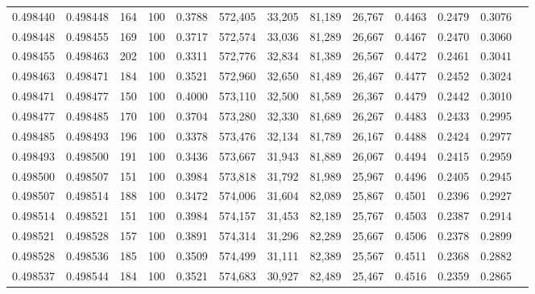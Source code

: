 \begin{tabular}{rrrrrrrrrrrrr}
0.498440 & 0.498448 &   164 & 100 &                                     0.3788 & 572,405 &  33,205 &  81,189 &  26,767 & 0.4463 & 0.2479 & 0.3076 \\
0.498448 & 0.498455 &   169 & 100 &                                     0.3717 & 572,574 &  33,036 &  81,289 &  26,667 & 0.4467 & 0.2470 & 0.3060 \\
0.498455 & 0.498463 &   202 & 100 &                                     0.3311 & 572,776 &  32,834 &  81,389 &  26,567 & 0.4472 & 0.2461 & 0.3041 \\
0.498463 & 0.498471 &   184 & 100 &                                     0.3521 & 572,960 &  32,650 &  81,489 &  26,467 & 0.4477 & 0.2452 & 0.3024 \\
0.498471 & 0.498477 &   150 & 100 &                                     0.4000 & 573,110 &  32,500 &  81,589 &  26,367 & 0.4479 & 0.2442 & 0.3010 \\
0.498477 & 0.498485 &   170 & 100 &                                     0.3704 & 573,280 &  32,330 &  81,689 &  26,267 & 0.4483 & 0.2433 & 0.2995 \\
0.498485 & 0.498493 &   196 & 100 &                                     0.3378 & 573,476 &  32,134 &  81,789 &  26,167 & 0.4488 & 0.2424 & 0.2977 \\
0.498493 & 0.498500 &   191 & 100 &                                     0.3436 & 573,667 &  31,943 &  81,889 &  26,067 & 0.4494 & 0.2415 & 0.2959 \\
0.498500 & 0.498507 &   151 & 100 &                                     0.3984 & 573,818 &  31,792 &  81,989 &  25,967 & 0.4496 & 0.2405 & 0.2945 \\
0.498507 & 0.498514 &   188 & 100 &                                     0.3472 & 574,006 &  31,604 &  82,089 &  25,867 & 0.4501 & 0.2396 & 0.2927 \\
0.498514 & 0.498521 &   151 & 100 &                                     0.3984 & 574,157 &  31,453 &  82,189 &  25,767 & 0.4503 & 0.2387 & 0.2914 \\
0.498521 & 0.498528 &   157 & 100 &                                     0.3891 & 574,314 &  31,296 &  82,289 &  25,667 & 0.4506 & 0.2378 & 0.2899 \\
0.498528 & 0.498536 &   185 & 100 &                                     0.3509 & 574,499 &  31,111 &  82,389 &  25,567 & 0.4511 & 0.2368 & 0.2882 \\
0.498537 & 0.498544 &   184 & 100 &                                     0.3521 & 574,683 &  30,927 &  82,489 &  25,467 & 0.4516 & 0.2359 & 0.2865 \\

\end{tabular}
